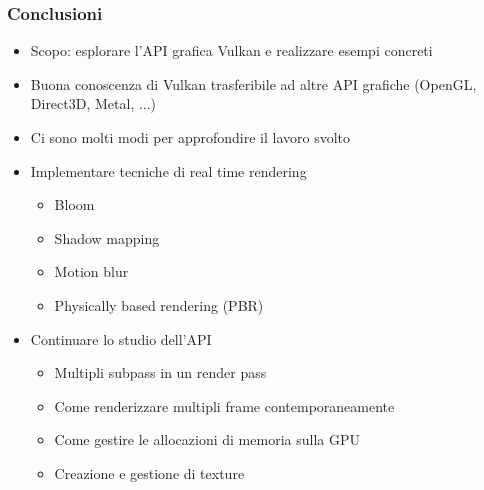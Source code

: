 \begin{frame}
\frametitle{Conclusioni}
\begin{itemize}
\item Scopo: esplorare l'API grafica Vulkan e realizzare esempi concreti
\item Buona conoscenza di Vulkan trasferibile ad altre API grafiche (OpenGL, Direct3D, Metal, ...)
\item Ci sono molti modi per approfondire il lavoro svolto
\item Implementare tecniche di real time rendering
\begin{itemize}
\item Bloom
\item Shadow mapping
\item Motion blur
\item Physically based rendering (PBR)
\end{itemize}
\item Continuare lo studio dell'API
\begin{itemize}
\item Multipli subpass in un render pass
\item Come renderizzare multipli frame contemporaneamente
\item Come gestire le allocazioni di memoria sulla GPU
\item Creazione e gestione di texture
\end{itemize}
\end{itemize}
\end{frame}
